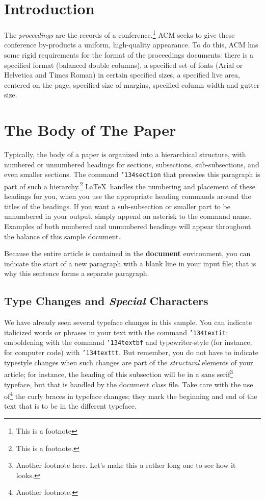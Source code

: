 \section{Introduction}

The \textit{proceedings} are the records of a conference.\footnote{This
  is a footnote}  ACM seeks
to give these conference by-products a uniform, high-quality
appearance.  To do this, ACM has some rigid requirements for the
format of the proceedings documents: there is a specified format
(balanced double columns), a specified set of fonts (Arial or
Helvetica and Times Roman) in certain specified sizes, a specified
live area, centered on the page, specified size of margins, specified
column width and gutter size.

\section{The Body of The Paper}
Typically, the body of a paper is organized into a hierarchical
structure, with numbered or unnumbered headings for sections,
subsections, sub-subsections, and even smaller sections.  The command
\texttt{{\char'134}section} that precedes this paragraph is part of
such a hierarchy.\footnote{This is a footnote.} \LaTeX\ handles the
numbering and placement of these headings for you, when you use the
appropriate heading commands around the titles of the headings.  If
you want a sub-subsection or smaller part to be unnumbered in your
output, simply append an asterisk to the command name.  Examples of
both numbered and unnumbered headings will appear throughout the
balance of this sample document.

Because the entire article is contained in the \textbf{document}
environment, you can indicate the start of a new paragraph with a
blank line in your input file; that is why this sentence forms a
separate paragraph.

\subsection{Type Changes and {\itshape Special} Characters}

We have already seen several typeface changes in this sample.  You can
indicate italicized words or phrases in your text with the command
\texttt{{\char'134}textit}; emboldening with the command
\texttt{{\char'134}textbf} and typewriter-style (for instance, for
computer code) with \texttt{{\char'134}texttt}.  But remember, you do
not have to indicate typestyle changes when such changes are part of
the \textit{structural} elements of your article; for instance, the
heading of this subsection will be in a sans serif\footnote{Another
  footnote here.  Let's make this a rather long one to see how it
  looks.} typeface, but that is handled by the document class file.
Take care with the use of\footnote{Another footnote.}  the
curly braces in typeface changes; they mark the beginning and end of
the text that is to be in the different typeface.

